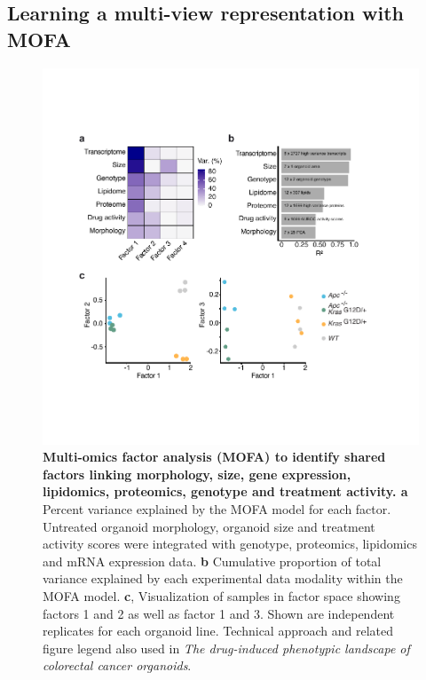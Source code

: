 \begin{flushleft}
\subsection{Learning a multi-view representation with MOFA}

\begin{figure}[h!]
\centering
\includegraphics[width=400pt,
                height=\textheight,
                keepaspectratio]{figures/adenomaprofiling/pdf/fig_1_7.pdf}
\caption[Multi-omics factor analysis (MOFA) to identify shared factors linking morphology, molecular state and treatment activity]{\textbf{Multi-omics factor analysis (MOFA) to identify shared factors linking morphology, size, gene expression, lipidomics, proteomics, genotype and treatment activity. a} Percent variance explained by the MOFA model for each factor. Untreated organoid morphology, organoid size and treatment activity scores were integrated with genotype, proteomics, lipidomics and mRNA expression data. \textbf{b} Cumulative proportion of total variance explained by each experimental data modality within the MOFA model. \textbf{c}, Visualization of samples in factor space showing factors 1 and 2 as well as factor 1 and 3. Shown are independent replicates for each organoid line. Technical approach and related figure legend also used in \textit{The drug-induced phenotypic landscape of colorectal cancer organoids}\parencite{betgeDruginducedPhenotypicLandscape2022}.
}
\label{fig_170}
\end{figure}
\bigbreak


\end{flushleft}
